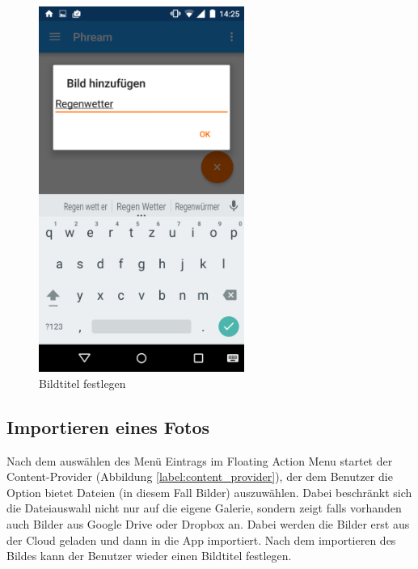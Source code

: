 \begin{figure}[H]
\begin{minipage}{0.4\textwidth}
	\includegraphics[width=0.6\textwidth]{images/screenshots/camera_imagetitle.png}
	\caption{Bildtitel festlegen}
	\label{label:camera_imagetitle}
	\end{minipage}
\end{figure}

\subsection{Importieren eines Fotos}
Nach dem auswählen des Menü Eintrags im Floating Action Menu startet der Content-Provider (Abbildung \ref{label:content_provider}), der dem Benutzer die Option bietet Dateien (in diesem Fall Bilder) auszuwählen. Dabei beschränkt sich die Dateiauswahl nicht nur auf die eigene Galerie, sondern zeigt falls vorhanden auch Bilder aus Google Drive oder Dropbox an. Dabei werden die Bilder erst aus der Cloud geladen und dann in die App importiert. Nach dem importieren des Bildes kann der Benutzer wieder einen Bildtitel festlegen.

